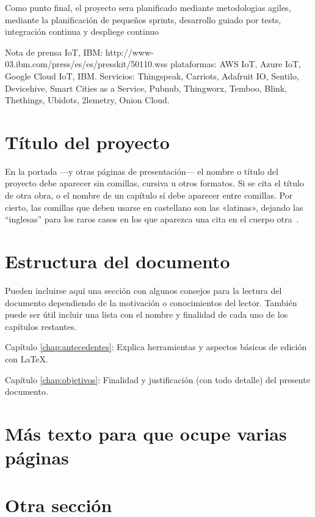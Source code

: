 Como punto final, el proyecto sera planificado mediante metodologias agiles,
mediante la planificación de pequeños sprints, desarrollo guiado por
tests, integración continua y despliege continuo 

Nota de prensa IoT, IBM: http://www-03.ibm.com/press/es/es/presskit/50110.wss
plataformas: AWS IoT, Azure IoT, Google Cloud IoT, IBM.
Servicios: Thingspeak, Carriots, Adafruit IO, Sentilo, Devicehive, Smart Cities as a Service, Pubnub, Thingworx, Temboo, Blink, Thethings, Ubidots, 2lemetry, Onion Cloud.

\section{Título del proyecto}

En la portada ---y otras páginas de presentación--- el nombre o título del
proyecto debe aparecer sin comillas, cursiva u otros formatos. Si se cita el
título de otra obra, o el nombre de un capítulo sí debe aparecer entre
comillas. Por cierto, las comillas que deben usarse en castellano son las
«latinas», dejando las ``inglesas'' para los raros casos en los que aparezca una
cita en el cuerpo otra~\cite{sousa}.


\section{Estructura del documento}

Pueden incluirse aquí una sección con algunos consejos para la lectura del
documento dependiendo de la motivación o conocimientos del lector.  También
puede ser útil incluir una lista con el nombre y finalidad de cada uno de los
capítulos restantes.

\begin{definitionlist}
\item[Capítulo \ref{chap:antecedentes}: \nameref{chap:antecedentes}] Explica herramientas
  y aspectos básicos de edición con \LaTeX.
\item[Capítulo \ref{chap:objetivos}: \nameref{chap:objetivos}] Finalidad y justificación
  (con todo detalle) del presente documento.
\end{definitionlist}


\section{Más texto para que ocupe varias páginas}

\blindtext
\blinditemize[4]
\blindmathpaper

\section{Otra sección}

\blindtext


